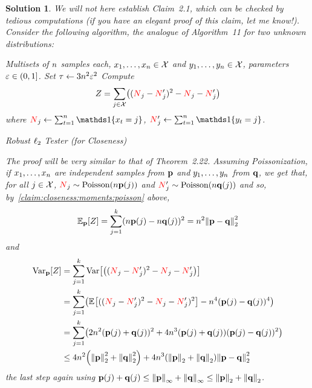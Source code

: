 \documentclass[biber]{nowfnt} %
\newtheorem{solution}{Solution}[chapter]
\newcommand{\occur}{\textcolor{red}{N}}
\newcommand{\occur}{N}
\begin{document}
\begin{solution}
We will not here establish Claim~2.1, which can be checked by tedious computations \emph{(if you have an elegant proof of this claim, let me know!)}. Consider the following algorithm, the analogue of Algorithm~11 for two unknown distributions:
\begin{algorithm}[ht!]
  \begin{algorithmic}[1]
    \Require Multisets of $\ns$ samples each, $x_1,\dots,x_\ns \in \domain$ and $y_1,\dots,y_\ns \in \domain$, parameters $\dst\in(0,1]$.
    \State Set $\tau \gets 3\ns^2\dst^2$
    \State Compute
    \[
        Z = \sum_{j\in\domain} \Paren{(\occur_j-\occur_j')^2-\occur_j-\occur_j'}
    \] where $\occur_j \gets \sum_{t=1}^\ns\indic{x_t=j}$, $\occur_j' \gets \sum_{t=1}^\ns\indic{y_t=j}$.
     \Return \reject {}
    \Else\ 
      \Return \accept {}
    \EndIf
  \end{algorithmic}
  \caption{\label{algo:l2:closeness}\sc Robust $\lp[2]$ Tester (for Closeness)}
\end{algorithm}
The proof will be very similar to that of Theorem~2.22. Assuming Poissonization, if $x_1,\dots,x_\ns$ are independent samples from $\p$ and $y_1,\dots,y_\ns$ from $\q$, we get that, for all $j\in\domain$, $\occur_j\sim\poisson{\ns\p(j)}$  and $\occur'_j\sim\poisson{\ns\q(j)}$ and so, by~\cref{claim:closeness:moments:poisson} above,
\begin{align}
	\bE{\p}{Z} = \sum_{j=1}^\ab (\ns\p(j)-\ns\q(j))^2 = \ns^2 \normtwo{\p-\q}^2
\end{align}
and
\begin{align}
	\Var_{\p}[Z] 
	&= \sum_{j=1}^\ab \Var\mleft[\Paren{(\occur_j-\occur_j')^2-\occur_j-\occur_j'}\mright] \notag\\
	&= \sum_{j=1}^\ab \Paren{ \bEE{((\occur_j-\occur_j')^2-\occur_j-\occur_j')^2} -  \ns^4(\p(j)-\q(j))^4}\notag\\
	&= \sum_{j=1}^\ab \Paren{2\ns^2(\p(j)+\q(j))^2 + 4\ns^3(\p(j)+\q(j))(\p(j)-\q(j))^2}\notag\\
	&\leq 4\ns^2\Paren{\normtwo{\p}^2+\normtwo{\q}^2} + 4\ns^3(\normtwo{\p}+\normtwo{\q})\normtwo{\p-\q}^2
\end{align}
the last step again using $\p(j)+\q(j)\leq \norminf{\p}+\norminf{\q} \leq \normtwo{\p}+\normtwo{\q}$.


\end{solution}
\end{document}

